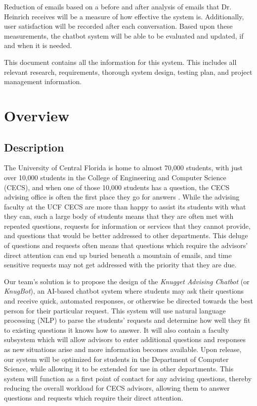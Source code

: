 \documentclass[titlepage, 12pt]{article}
\begin{document}
Reduction of emails based on a before and after analysis of emails that Dr. Heinrich receives will be a measure of how effective the system is. Additionally, user satisfaction will be recorded after each conversation. Based upon these measurements, the chatbot system will be able to be evaluated and updated, if and when it is needed.

This document contains all the information for this system. This includes all relevant research, requirements, thorough system design, testing plan, and project management information.


\pagebreak



\section{Overview}

\subsection{Description}

The University of Central Florida is home to almost 70,000 students, with just over 10,000 students in the College of Engineering and Computer Science (CECS), and when one of those 10,000 students has a question, the CECS advising office is often the first place they go for answers \cite{bib-1-1}. While the advising faculty at the UCF CECS are more than happy to assist its students with what they can, such a large body of students means that they are often met with repeated questions, requests for information or services that they cannot provide, and questions that would be better addressed to other departments. This deluge of questions and requests often means that questions which require the advisors’ direct attention can end up buried beneath a mountain of emails, and time sensitive requests may not get addressed with the priority that they are due.

Our team’s solution is to propose the design of the \emph{Knugget Advising Chatbot} (or \emph{KnugBot}), an AI-based chatbot system where students may ask their questions and receive quick, automated responses, or otherwise be directed towards the best person for their particular request. This system will use natural language processing (NLP) to parse the students’ requests and determine how well they fit to existing questions it knows how to answer. It will also contain a faculty subsystem which will allow advisors to enter additional questions and responses as new situations arise and more information becomes available. Upon release, our system will be optimized for students in the Department of Computer Science, while allowing it to be extended for use in other departments. This system will function as a first point of contact for any advising questions, thereby reducing the overall workload for CECS advisors, allowing them to answer questions and requests which require their direct attention.
\end{document}
